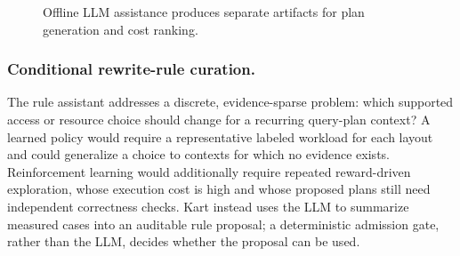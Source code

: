 \begin{figure}[H]
\centering\small
\begin{minipage}[c]{0.46\linewidth}\centering
{}
\end{minipage}\hfill
\begin{minipage}[c]{0.46\linewidth}\centering
{}
\end{minipage}
\caption{Offline LLM assistance produces separate artifacts for plan generation and cost ranking.}\label{fig:offline-llm-optimization}
\end{figure}

\subsubsection{Conditional rewrite-rule curation.}
The rule assistant addresses a discrete, evidence-sparse problem: which supported access or resource choice should change for a recurring query-plan context? A learned policy would require a representative labeled workload for each layout and could generalize a choice to contexts for which no evidence exists. Reinforcement learning would additionally require repeated reward-driven exploration, whose execution cost is high and whose proposed plans still need independent correctness checks. Kart instead uses the LLM to summarize measured cases into an auditable rule proposal; a deterministic admission gate, rather than the LLM, decides whether the proposal can be used.

